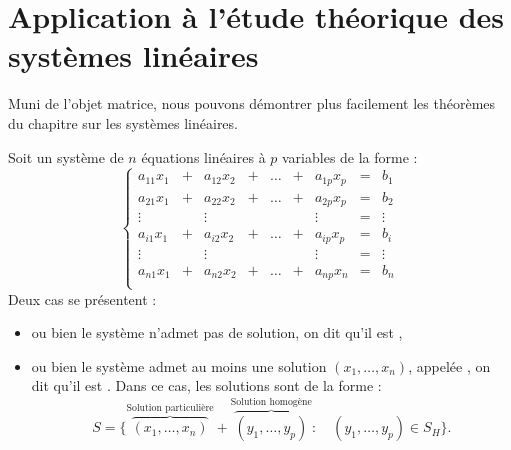 \documentclass{book}
\begin{document}
\section{Application à l'étude théorique des systèmes linéaires}
Muni de l'objet matrice, nous pouvons démontrer plus facilement les théorèmes du chapitre sur les systèmes linéaires.
\begin{Theoreme}
Soit un système de $n$ équations linéaires à $p$ variables de la forme :
$$\left\{{\begin{matrix}
a_{11}x_{1}&+&a_{12}x_{2}&+&\dots &+&a_{1p}x_{p}&=&b_{1}\\
a_{21}x_{1}&+&a_{22}x_{2}&+&\dots &+&a_{2p}x_{p}&=&b_{2}\\
\vdots&&\vdots&& &&\vdots&=&\vdots \\
a_{i1}x_{1}&+&a_{i2}x_{2}&+&\dots &+&a_{ip}x_{p}&=&b_{i}\\
\vdots&&\vdots&& &&\vdots&=&\vdots \\
a_{n1}x_{1}&+&a_{n2}x_{2}&+&\dots &+&a_{np}x_{n}&=&b_{n}\\
\end{matrix}}\right. $$
Deux cas se présentent :
\begin{itemize}
\item ou bien le système n'admet pas de solution, on dit qu'il est , 
\item ou bien le système admet au moins une solution $(x_1,\dots,x_n)$, appelée , on dit qu'il est . Dans ce cas, les solutions sont de la forme :
$$ S=\{\overbrace{(x_1,\dots ,x_n)}^{\text{Solution particulière}}+ \overbrace{(y_1,\dots,y_p)}^{\text{Solution homogène}}:\quad (y_1,\dots,y_p) \in S_H\}.$$
\end{itemize}
\end{Theoreme}
\end{document}
